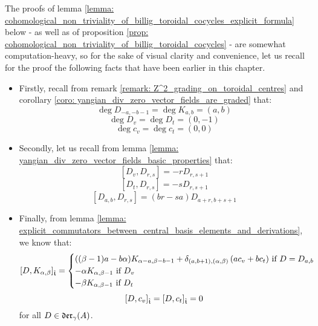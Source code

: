         \begin{remark}
            The proofs of lemma \ref{lemma: cohomological_non_triviality_of_billig_toroidal_cocycles_explicit_formula} below - as well as of proposition \ref{prop: cohomological_non_triviality_of_billig_toroidal_cocycles} - are somewhat computation-heavy, so for the sake of visual clarity and convenience, let us recall for the proof the following facts that have been earlier in this chapter.
            \begin{itemize}
                \item Firstly, recall from remark \ref{remark: Z^2_grading_on_toroidal_centres} and corollary \ref{coro: yangian_div_zero_vector_fields_are_graded} that:
                    $$\deg D_{-a, -b - 1} = \deg K_{a, b} = (a, b)$$
                    $$\deg D_v = \deg D_t = (0, -1)$$
                    $$\deg c_v = \deg c_t = (0, 0)$$
                \item Secondly, let us recall from lemma \ref{lemma: yangian_div_zero_vector_fields_basic_properties} that:
                    $$[D_v, D_{r, s}] = -r D_{r, s + 1}$$
                    $$[D_t, D_{r, s}] = -s D_{r, s + 1}$$
                    $$[D_{a, b}, D_{r, s}] = (br - sa) D_{a + r, b + s + 1}$$
                \item Finally, from lemma \ref{lemma: explicit_commutators_between_central_basis_elements_and_derivations}, we know that:
                    $$[D, K_{\alpha, \beta}]_{\hat{\mathfrak{t}}} =
                        \begin{cases}
                            \text{$((\beta - 1)a - b\alpha) K_{\alpha - a, \beta - b - 1} + \delta_{(a, b + 1), (\alpha, \beta)} \left( a c_v + b c_t \right)$ if $D = D_{a, b}$}
                            \\
                            \text{$-\alpha K_{\alpha, \beta - 1}$ if $D_v$}
                            \\
                            \text{$-\beta K_{\alpha, \beta - 1}$ if $D_t$}
                        \end{cases}
                    $$
                    $$[D, c_v]_{\hat{\mathfrak{t}}} = [D, c_t]_{\hat{\mathfrak{t}}} = 0$$
                for all $D \in \mathfrak{der}_{\gamma}(A)$.
            \end{itemize}
        \end{remark}

